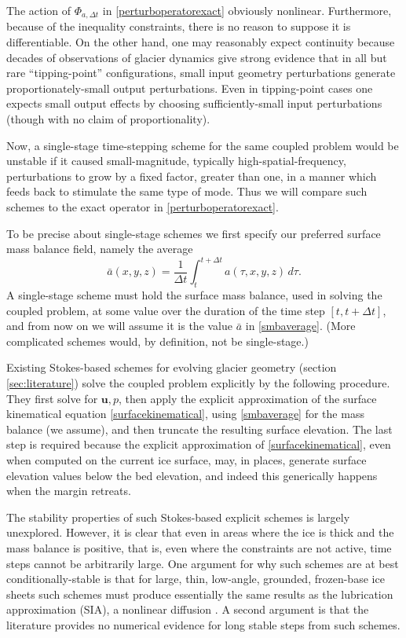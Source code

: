 \documentclass[letterpaper,final,12pt,reqno]{amsart}
\newcommand{\bu}{\mathbf{u}}
\begin{document}
The action of $\Phi_{a,\Delta t}$ in \eqref{perturboperatorexact} obviously nonlinear.  Furthermore, because of the inequality constraints, there is no reason to suppose it is differentiable.  On the other hand, one may reasonably expect continuity because decades of observations of glacier dynamics give strong evidence that in all but rare ``tipping-point'' configurations, small input geometry perturbations generate proportionately-small output perturbations.  Even in tipping-point cases one expects small output effects by choosing sufficiently-small input perturbations (though with no claim of proportionality).

Now, a single-stage \cite{AscherPetzold1998} time-stepping scheme for the same coupled problem would be unstable if it caused small-magnitude, typically high-spatial-frequency, perturbations to grow by a fixed factor, greater than one, in a manner which feeds back to stimulate the same type of mode.  Thus we will compare such schemes to the exact operator in \eqref{perturboperatorexact}.

To be precise about single-stage schemes we first specify our preferred surface mass balance field, namely the average
\begin{equation}
\bar a(x,y,z) = \frac{1}{\Delta t} \int_t^{t+\Delta t} a(\tau,x,y,z)\,d\tau.  \label{smbaverage}
\end{equation}
A single-stage scheme must hold the surface mass balance, used in solving the coupled problem, at some value over the duration of the time step $[t,t+\Delta t]$, and from now on we will assume it is the value $\bar a$ in \eqref{smbaverage}.  (More complicated schemes would, by definition, not be single-stage.)

Existing Stokes-based schemes for evolving glacier geometry (section \ref{sec:literature}) solve the coupled problem explicitly by the following procedure.  They first solve for $\bu,p$, then apply the explicit approximation of the surface kinematical equation \eqref{surfacekinematical}, using \eqref{smbaverage} for the mass balance (we assume), and then truncate the resulting surface elevation.  The last step is required because the explicit approximation of \eqref{surfacekinematical}, even when computed on the current ice surface, may, in places, generate surface elevation values below the bed elevation, and indeed this generically happens when the margin retreats.

The stability properties of such Stokes-based explicit schemes is largely unexplored.  However, it is clear that even in areas where the ice is thick and the mass balance is positive, that is, even where the constraints are not active, time steps cannot be arbitrarily large.  One argument for why such schemes are at best conditionally-stable is that for large, thin, low-angle, grounded, frozen-base ice sheets such schemes must produce essentially the same results as the lubrication approximation (SIA), a nonlinear diffusion \cite{Calvoetal2002,JouvetBueler2012}.  A second argument is that the literature provides no numerical evidence for long stable steps from such schemes.
\end{document}
